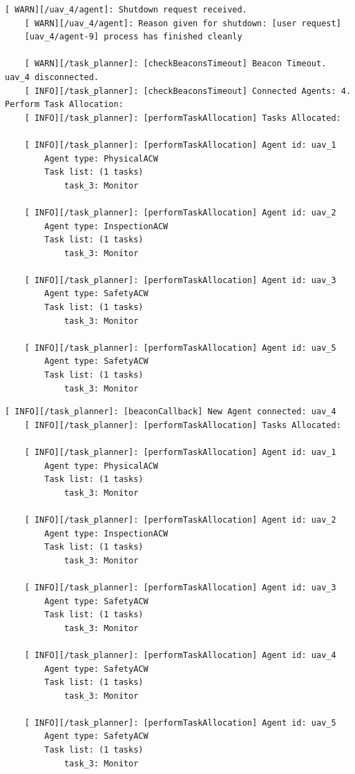 \begin{lstlisting}[caption={Feedback messages printed after an \gls{ACW} disconnects}, breaklines=true, label=exit:Disconnection]
    [ WARN][/uav_4/agent]: Shutdown request received.
    [ WARN][/uav_4/agent]: Reason given for shutdown: [user request]
    [uav_4/agent-9] process has finished cleanly
    
    [ WARN][/task_planner]: [checkBeaconsTimeout] Beacon Timeout. uav_4 disconnected.
    [ INFO][/task_planner]: [checkBeaconsTimeout] Connected Agents: 4. Perform Task Allocation:
    [ INFO][/task_planner]: [performTaskAllocation] Tasks Allocated:
    
    [ INFO][/task_planner]: [performTaskAllocation] Agent id: uav_1
        Agent type: PhysicalACW
        Task list: (1 tasks)
            task_3: Monitor
    
    [ INFO][/task_planner]: [performTaskAllocation] Agent id: uav_2
        Agent type: InspectionACW
        Task list: (1 tasks)
            task_3: Monitor
    
    [ INFO][/task_planner]: [performTaskAllocation] Agent id: uav_3
        Agent type: SafetyACW
        Task list: (1 tasks)
            task_3: Monitor
    
    [ INFO][/task_planner]: [performTaskAllocation] Agent id: uav_5
        Agent type: SafetyACW
        Task list: (1 tasks)
            task_3: Monitor
\end{lstlisting}

\begin{lstlisting}[caption={Feedback messages printed after an \gls{ACW} reconnects}, breaklines=true, label=exit:Reconnection]
    [ INFO][/task_planner]: [beaconCallback] New Agent connected: uav_4
    [ INFO][/task_planner]: [performTaskAllocation] Tasks Allocated:
    
    [ INFO][/task_planner]: [performTaskAllocation] Agent id: uav_1
        Agent type: PhysicalACW
        Task list: (1 tasks)
            task_3: Monitor
    
    [ INFO][/task_planner]: [performTaskAllocation] Agent id: uav_2
        Agent type: InspectionACW
        Task list: (1 tasks)
            task_3: Monitor
    
    [ INFO][/task_planner]: [performTaskAllocation] Agent id: uav_3
        Agent type: SafetyACW
        Task list: (1 tasks)
            task_3: Monitor
    
    [ INFO][/task_planner]: [performTaskAllocation] Agent id: uav_4
        Agent type: SafetyACW
        Task list: (1 tasks)
            task_3: Monitor
    
    [ INFO][/task_planner]: [performTaskAllocation] Agent id: uav_5
        Agent type: SafetyACW
        Task list: (1 tasks)
            task_3: Monitor
\end{lstlisting}


